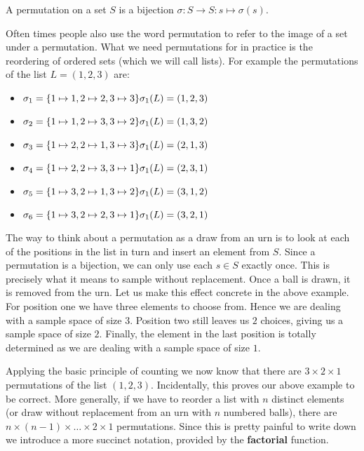 \begin{Definition}[Permutation]
A permutation on a set $ S $ is a bijection $ \sigma : S \rightarrow S : s \mapsto \sigma(s) $.
\end{Definition}

Often times people also use the word permutation to refer to the image of a set under a permutation. What we
need permutations for in practice is the reordering of ordered sets (which we will call lists). For example
the permutations of the list $ L = (1,2,3) $ are:
\begin{itemize}
\item $ \sigma_{1} = \{1 \mapsto 1, 2 \mapsto 2, 3 \mapsto 3 \} \hfill \sigma_{1}(L) = (1,2,3) $
\item $ \sigma_{2} = \{1 \mapsto 1, 2 \mapsto 3, 3 \mapsto 2 \} \hfill \sigma_{1}(L) = (1,3,2) $
\item $ \sigma_{3} = \{1 \mapsto 2, 2 \mapsto 1, 3 \mapsto 3 \} \hfill \sigma_{1}(L) = (2,1,3) $
\item $ \sigma_{4} = \{1 \mapsto 2, 2 \mapsto 3, 3 \mapsto 1 \} \hfill \sigma_{1}(L) = (2,3,1) $
\item $ \sigma_{5} = \{1 \mapsto 3, 2 \mapsto 1, 3 \mapsto 2 \} \hfill \sigma_{1}(L) = (3,1,2) $
\item $ \sigma_{6} = \{1 \mapsto 3, 2 \mapsto 2, 3 \mapsto 1 \} \hfill \sigma_{1}(L) = (3,2,1) $
\end{itemize}

The way to think about a permutation as a draw from an urn is to look at each of the positions in the list in
turn and insert an element from $ S $. Since a permutation is a bijection, we can only use each
$ s \in S $ exactly once. This is precisely what it means to sample without replacement. Once a ball
is drawn, it is removed from the urn. Let us make this effect concrete in the above example. For position one
we have three elements to choose from. Hence we are dealing with a sample space of size $ 3 $. Position two
still leaves us $ 2 $ choices, giving us a sample space of size $ 2 $. Finally, the element in the last position
is totally determined as we are dealing with a sample space of size $ 1 $.

Applying the basic principle of counting we now know that there are $ 3 \times 2 \times 1 $ permutations of the list
$ (1,2,3) $. Incidentally, this proves our above example to be correct. More generally, if we have to reorder
a list with $ n $ distinct elements (or draw without replacement from an urn with $ n $ numbered balls), there
are $ n \times (n-1) \times \ldots \times 2 \times 1 $ permutations. Since this is pretty painful to write down
we introduce a more succinct notation, provided by the \textbf{factorial} function.

